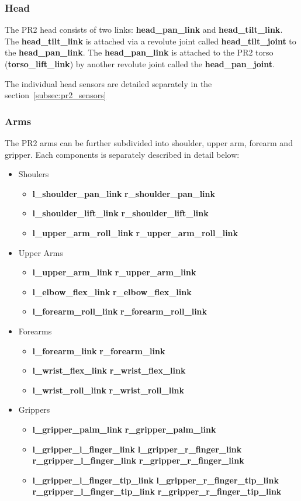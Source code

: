 \subsubsection{Head}
The PR2 head consists of two links: {\bf head\_pan\_link} and {\bf head\_tilt\_link}.  The {\bf head\_tilt\_link} is attached via a revolute joint called {\bf head\_tilt\_joint} to the {\bf head\_pan\_link}.
The {\bf head\_pan\_link} is attached to the PR2 torso ({\bf torso\_lift\_link}) by another revolute joint called the {\bf head\_pan\_joint}.

The individual head sensors are detailed separately in the section~\ref{subsec:pr2_sensors}

\subsubsection{Arms}
The PR2 arms can be further subdivided into shoulder, upper arm, forearm and gripper.  Each components is separately described in detail below:
\begin{itemize}
\item Shoulers
  \begin{itemize}
  \item {\bf l\_shoulder\_pan\_link} {\bf r\_shoulder\_pan\_link}
  \item {\bf l\_shoulder\_lift\_link} {\bf r\_shoulder\_lift\_link}
  \item {\bf l\_upper\_arm\_roll\_link} {\bf r\_upper\_arm\_roll\_link}
  \end{itemize}
\item Upper Arms
  \begin{itemize}
  \item {\bf l\_upper\_arm\_link} {\bf r\_upper\_arm\_link}
  \item {\bf l\_elbow\_flex\_link} {\bf r\_elbow\_flex\_link}
  \item {\bf l\_forearm\_roll\_link} {\bf r\_forearm\_roll\_link}
  \end{itemize}
\item Forearms
  \begin{itemize}
  \item {\bf l\_forearm\_link} {\bf r\_forearm\_link}
  \item {\bf l\_wrist\_flex\_link} {\bf r\_wrist\_flex\_link}
  \item {\bf l\_wrist\_roll\_link} {\bf r\_wrist\_roll\_link}
  \end{itemize}
\item Grippers
  \begin{itemize}
  \item {\bf l\_gripper\_palm\_link} {\bf r\_gripper\_palm\_link}
  \item {\bf l\_gripper\_l\_finger\_link} {\bf l\_gripper\_r\_finger\_link}
        {\bf r\_gripper\_l\_finger\_link} {\bf r\_gripper\_r\_finger\_link}
  \item {\bf l\_gripper\_l\_finger\_tip\_link} {\bf l\_gripper\_r\_finger\_tip\_link}
        {\bf r\_gripper\_l\_finger\_tip\_link} {\bf r\_gripper\_r\_finger\_tip\_link}
  \end{itemize}
\end{itemize}


